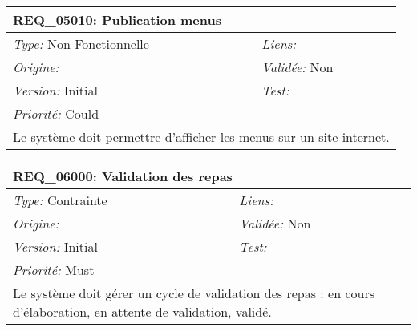 \begin{table}[!h]

\begin{tabular}{|p{60mm}p{100mm}|}

\hline

\multicolumn{2}{|l|}{\textbf{REQ\_05010:} Publication menus} \\ \hline

\emph{Type:} Non Fonctionnelle & \emph{Liens:}  \\

\emph{Origine:}  & \emph{Validée:} Non \\

\emph{Version:} Initial & \emph{Test:}  \\

\emph{Priorité:} Could & \\ \hline

\multicolumn{2}{|p{16cm}|}{Le système doit permettre d'afficher les menus sur un site internet.} \\ \hline

\end{tabular}

\end{table}



\begin{table}[!h]

\begin{tabular}{|p{60mm}p{100mm}|}

\hline

\multicolumn{2}{|l|}{\textbf{REQ\_06000:} Validation des repas} \\ \hline

\emph{Type:} Contrainte & \emph{Liens:}  \\

\emph{Origine:}  & \emph{Validée:} Non \\

\emph{Version:} Initial & \emph{Test:}  \\

\emph{Priorité:} Must & \\ \hline

\multicolumn{2}{|p{16cm}|}{Le système doit gérer un cycle de validation des repas : en cours d'élaboration, en attente de validation, validé.} \\ \hline

\end{tabular}

\end{table}



